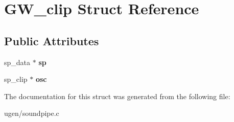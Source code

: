 \hypertarget{structGW__clip}{}\section{G\+W\+\_\+clip Struct Reference}
\label{structGW__clip}
\subsection*{Public Attributes}
\begin{DoxyCompactItemize}
\item 
\hypertarget{structGW__clip_a1e32c62cc6ceb7156760da5af43095b5}{}\label{structGW__clip_a1e32c62cc6ceb7156760da5af43095b5} 
sp\+\_\+data $\ast$ {\bfseries sp}
\item 
\hypertarget{structGW__clip_a6f615f810fa44c279c1c74d94a1d67ce}{}\label{structGW__clip_a6f615f810fa44c279c1c74d94a1d67ce} 
sp\+\_\+clip $\ast$ {\bfseries osc}
\end{DoxyCompactItemize}


The documentation for this struct was generated from the following file\+:\begin{DoxyCompactItemize}
\item 
ugen/soundpipe.\+c\end{DoxyCompactItemize}
